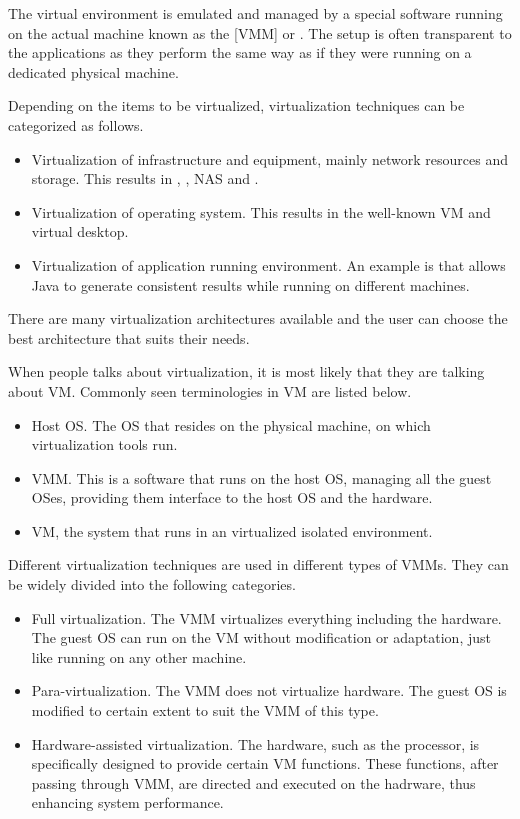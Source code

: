 The virtual environment is emulated and managed by a special software running on the actual machine known as the [VMM] or . The setup is often transparent to the applications as they perform the same way as if they were running on a dedicated physical machine.

Depending on the items to be virtualized, virtualization techniques can be categorized as follows.
\begin{itemize}
	\item Virtualization of infrastructure and equipment, mainly network resources and storage. This results in , , NAS and .
	\item Virtualization of operating system. This results in the well-known VM and virtual desktop.
	\item Virtualization of application running environment. An example is  that allows Java to generate consistent results while running on different machines.
\end{itemize}
There are many virtualization architectures available and the user can choose the best architecture that suits their needs.

When people talks about virtualization, it is most likely that they are talking about VM. Commonly seen terminologies in VM are listed below.
\begin{itemize}
	\item Host OS. The OS that resides on the physical machine, on which virtualization tools run.
	\item VMM. This is a software that runs on the host OS, managing all the guest OSes, providing them interface to the host OS and the hardware.
	\item VM, the system that runs in an virtualized isolated environment.
\end{itemize}

Different virtualization techniques are used in different types of VMMs. They can be widely divided into the following categories.
\begin{itemize}
	\item Full virtualization. The VMM virtualizes everything including the hardware. The guest OS can run on the VM without modification or adaptation, just like running on any other machine.
	\item Para-virtualization. The VMM does not virtualize hardware. The guest OS is modified to certain extent to suit the VMM of this type.
	\item Hardware-assisted virtualization. The hardware, such as the processor, is specifically designed to provide certain VM functions. These functions, after passing through VMM, are directed and executed on the hadrware, thus enhancing system performance.
\end{itemize}


